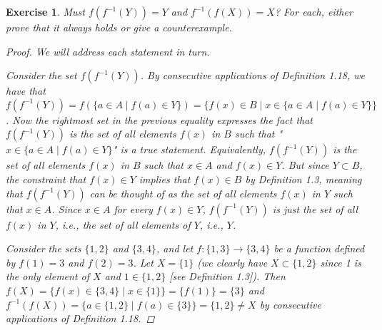 \documentclass[titlepage]{article}
\newcounter{script}
\newtheorem{exercise}{Exercise}[script]
\begin{document}
\setcounter{exercise}{18}

\begin{exercise}
    Must $f(f^{-1}(Y))=Y$ and $f^{-1}(f(X))=X$? For each, either prove that it always holds or give a counterexample.
    \begin{proof}
        We will address each statement in turn.\par
        Consider the set $f(f^{-1}(Y))$. By consecutive applications of Definition 1.18, we have that $f(f^{-1}(Y))=f(\{a\in A\mid f(a)\in Y\})=\{f(x)\in B\mid x\in\{a\in A\mid f(a)\in Y\}\}$. Now the rightmost set in the previous equality expresses the fact that $f(f^{-1}(Y))$ is the set of all elements $f(x)$ in $B$ such that "$x\in\{a\in A\mid f(a)\in Y\}$" is a true statement. Equivalently, $f(f^{-1}(Y))$ is the set of all elements $f(x)$ in $B$ such that $x\in A$ and $f(x)\in Y$. But since $Y\subset B$, the constraint that $f(x)\in Y$ implies that $f(x)\in B$ by Definition 1.3, meaning that $f(f^{-1}(Y))$ can be thought of as the set of all elements $f(x)$ in $Y$ such that $x\in A$. Since $x\in A$ for every $f(x)\in Y$, $f(f^{-1}(Y))$ is just the set of all $f(x)$ in $Y$, i.e., the set of all elements of $Y$, i.e., $Y$.\par
        Consider the sets $\{1,2\}$ and $\{3,4\}$, and let $f:\{1,3\}\to\{3,4\}$ be a function defined by $f(1)=3$ and $f(2)=3$. Let $X=\{1\}$ (we clearly have $X\subset\{1,2\}$ since 1 is the only element of $X$ and $1\in\{1,2\}$ [see Definition 1.3]). Then $f(X)=\{f(x)\in\{3,4\}\mid x\in\{1\}\}=\{f(1)\}=\{3\}$ and $f^{-1}(f(X))=\{a\in\{1,2\}\mid f(a)\in\{3\}\}=\{1,2\}\neq X$ by consecutive applications of Definition 1.18.
    \end{proof}
\end{exercise}


\setcounter{proposition}{25}
\end{document}
